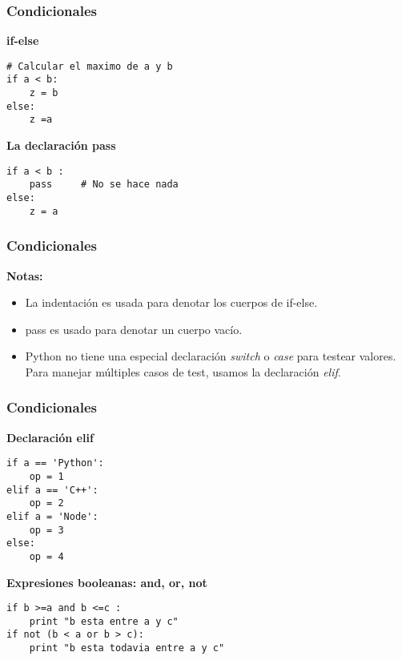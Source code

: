 \documentclass[10pt]{beamer}
\begin{document}
\begin{frame}[fragile]
\frametitle{Condicionales}

\textbf{if-else}
\begin{lstlisting}
# Calcular el maximo de a y b
if a < b:
    z = b
else:
    z =a
\end{lstlisting}

\textbf{La declaraci\'on pass}
\begin{lstlisting}
if a < b :
    pass     # No se hace nada
else:
    z = a
\end{lstlisting}
\end{frame}


\begin{frame}[fragile]
\frametitle{Condicionales}
\textbf{Notas:}
\begin{itemize}
\item La indentaci\'on es usada para denotar los cuerpos de  if-else.
\item pass es usado para denotar un cuerpo vac\'io.
\item Python no tiene una especial declaraci\'on \textit{switch} o \textit{case} para testear valores. Para manejar m\'ultiples casos de test, usamos la declaraci\'on \textit{elif}.
\end{itemize}
\end{frame}

\begin{frame}[fragile]
\frametitle{Condicionales}
\textbf{Declaraci\'on elif}

\begin{lstlisting}
if a == 'Python':
    op = 1
elif a == 'C++':
    op = 2
elif a = 'Node':
    op = 3
else:
    op = 4
\end{lstlisting}

\vspace{0.2cm}

\textbf{Expresiones booleanas: and, or, not}

\begin{lstlisting}
if b >=a and b <=c :
    print "b esta entre a y c"
if not (b < a or b > c):
    print "b esta todavia entre a y c"
\end{lstlisting}
\end{frame}
\end{document}
